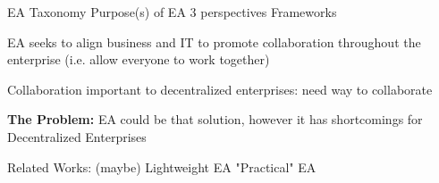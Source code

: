     EA Taxonomy
        Purpose(s) of EA
        3 perspectives
        Frameworks
    
    EA seeks to align business and IT to promote collaboration throughout the enterprise (i.e. allow everyone to work together)
    
    Collaboration important to decentralized enterprises: need way to collaborate
    
    \textbf{The Problem: }EA could be that solution, however it has shortcomings for Decentralized Enterprises
    
    Related Works: (maybe)
        Lightweight EA
        "Practical" EA
